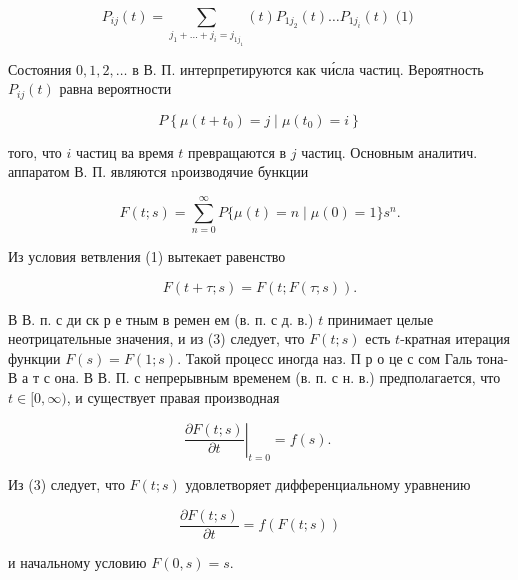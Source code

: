 \documentclass[10pt]{article}
\begin{document}
\[

P_{i j}(t)=\sum_{j_{1}+\ldots+j_{i}=j_{1 j_{1}}}(t) P_{1 j_{2}}(t) \ldots P_{1 j_{i}}(t) \text { (1) }

\]



Состояния $0,1,2, \ldots$ в В. П. интерпретируются как чи́сла частиц. Вероятность $P_{i j}(t)$ равна вероятности



\[

P\left\{\mu\left(t+t_{0}\right)=j \mid \mu\left(t_{0}\right)=i\right\}

\]



того, что $i$ частиц ва время $t$ превращаются в $j$ частиц. Основным аналитич. аппаратом В. П. являются nроизводячие бункции



\[

F(t ; s)=\sum_{n=0}^{\infty} P\{\mu(t)=n \mid \mu(0)=1\} s^{n} .

\]



Из условия ветвления (1) вытекает равенство



\[

F(t+\tau ; s)=F(t ; F(\tau ; s)) .

\]



В В. п. с ди ск р е тным в ремен ем (в. п. с д. в.) $t$ принимает целые неотрицательные значения, и из (3) следует, что $F(t ; s)$ есть $t$-кратная итерация функции $F(s)=F(1 ; s)$. Такой процесс иногда наз. П р о це с сом Галь тона-В а т с она. В В. П. с непрерывным временем (в. п. с н. в.) предполагается, что $t \in[0, \infty)$, и существует правая производная



\[

\left.\frac{\partial F(t ; s)}{\partial t}\right|_{t=0}=f(s) \text {. }

\]



Из (3) следует, что $F(t ; s)$ удовлетворяет дифференциальному уравнению



\[

\frac{\partial F(t ; s)}{\partial t}=f(F(t ; s))

\]



и начальному условию $F(0, s)=s$.
\end{document}
